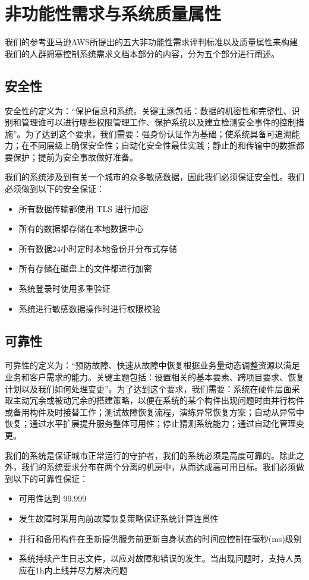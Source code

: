 \documentclass{ctexrep}
\begin{document}
\section{非功能性需求与系统质量属性}
我们的参考亚马逊AWS所提出的五大非功能性需求评判标准以及质量属性来构建我们的人群拥塞控制系统需求文档本部分的内容，分为五个部分进行阐述。
\subsection{安全性}
安全性的定义为：“保护信息和系统。关键主题包括：数据的机密性和完整性、识别和管理谁可以进行哪些权限管理工作、保护系统以及建立检测安全事件的控制措施”。为了达到这个要求，我们需要：强身份认证作为基础；使系统具备可追溯能力；在不同层级上确保安全性；自动化安全性最佳实践；静止的和传输中的数据都要保护；提前为安全事故做好准备。

我们的系统涉及到有关一个城市的众多敏感数据，因此我们必须保证安全性。我们必须做到以下的安全保证：
\begin{itemize}
\item 所有数据传输都使用 TLS 进行加密
\item 所有的数据都存储在本地数据中心
\item 所有数据24小时定时本地备份并分布式存储
\item 所有存储在磁盘上的文件都进行加密
\item 系统登录时使用多重验证
\item 系统进行敏感数据操作时进行权限校验
\end{itemize}

\subsection{可靠性}
可靠性的定义为：“预防故障、快速从故障中恢复根据业务量动态调整资源以满足业务和客户需求的能力。关键主题包括：设置相关的基本要素、跨项目要求、恢复计划以及我们如何处理变更”。为了达到这个要求，我们需要：系统在硬件层面采取主动冗余或被动冗余的搭建策略，以便在系统的某个构件出现问题时由并行构件或备用构件及时接替工作；测试故障恢复流程，演练异常恢复方案；自动从异常中恢复；通过水平扩展提升服务整体可用性；停止猜测系统能力；通过自动化管理变更。

我们的系统是保证城市正常运行的守护者，我们的系统必须是高度可靠的。除此之外，我们的系统要求分布在两个分离的机房中，从而达成高可用目标。我们必须做到以下的可靠性保证：
\begin{itemize}
\item 可用性达到 99.999%
\item 发生故障时采用向前故障恢复策略保证系统计算连贯性
\item 并行和备用构件在重新提供服务前更新自身状态的时间应控制在毫秒(ms)级别
\item 系统持续产生日志文件，以应对故障和错误的发生。当出现问题时，支持人员应在1h内上线并尽力解决问题
\end{itemize}
\end{document}
